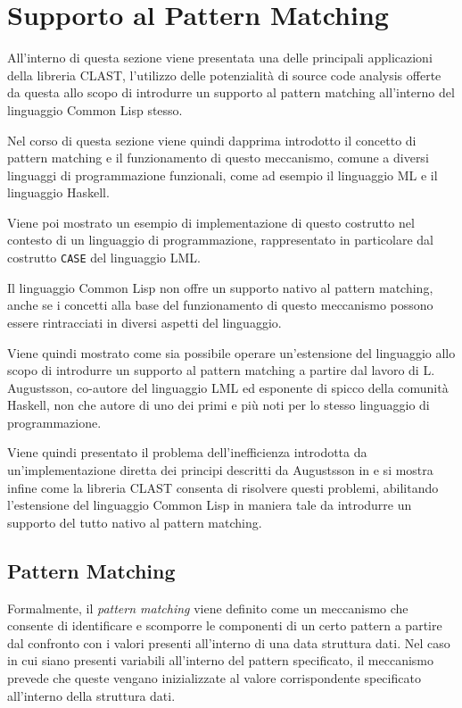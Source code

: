 \section{Supporto al Pattern Matching}
\label{pattern-matching}

All'interno di questa sezione viene presentata una delle principali applicazioni
della libreria CLAST, l'utilizzo delle potenzialità di source code analysis
offerte da questa allo scopo di introdurre un supporto al pattern matching
all'interno del linguaggio Common Lisp stesso.

Nel corso di questa sezione viene quindi dapprima introdotto il concetto di
pattern matching e il funzionamento di questo meccanismo, comune a diversi
linguaggi di programmazione funzionali, come ad esempio il linguaggio ML e il
linguaggio Haskell.

Viene poi mostrato un esempio di implementazione di questo costrutto nel
contesto di un linguaggio di programmazione, rappresentato in particolare dal
costrutto \texttt{CASE} del linguaggio LML.

Il linguaggio Common Lisp non offre un supporto nativo al pattern matching,
anche se i concetti alla base del funzionamento di questo meccanismo possono
essere rintracciati in diversi aspetti del linguaggio.

Viene quindi mostrato come sia possibile operare un'estensione del linguaggio
allo scopo di introdurre un supporto al pattern matching a partire dal lavoro di
L. Augustsson, co-autore del linguaggio LML ed esponente di spicco della
comunità Haskell, non che autore di uno dei primi e più noti per lo stesso
linguaggio di programmazione.

Viene quindi presentato il problema dell'inefficienza introdotta da
un'implementazione diretta dei principi descritti da Augustsson in
\cite{DBLP:conf/lfp/Augustsson84} e si mostra infine come la libreria CLAST
consenta di risolvere questi problemi, abilitando l'estensione del linguaggio
Common Lisp in maniera tale da introdurre un supporto del tutto nativo al
pattern matching.

\subsection{Pattern Matching}

Formalmente, il \textit{pattern matching} viene definito come un meccanismo che
consente di identificare e scomporre le componenti di un certo pattern a partire
dal confronto con i valori presenti all’interno di una data struttura dati. Nel
caso in cui siano presenti variabili all’interno del pattern specificato, il
meccanismo prevede che queste vengano inizializzate al valore corrispondente
specificato all’interno della struttura dati.

